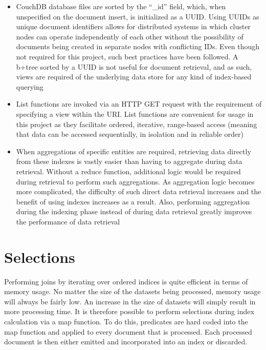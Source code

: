 \begin{itemize}
  \item CouchDB database files are sorted by the ``\_id'' field, which, when unspecified on the document insert, is initialized as a UUID. Using UUIDs as unique document identifiers allows for distributed systems in which cluster nodes can operate independently of each other without the possibility of documents being created in separate nodes with conflicting IDs. Even though not required for this project, such best practices have been followed. A b+tree sorted by a UUID is not useful for document retrieval, and as such, views are required of the underlying data store for any kind of index-based querying
  \item List functions are invoked via an HTTP GET request with the requirement of specifying a view within the URI. List functions are convenient for usage in this project as they facilitate ordered, iterative, range-based access (meaning that data can be accessed sequentially, in isolation and in reliable order)
  \item When aggregations of specific entities are required, retrieving data directly from these indexes is vastly easier than having to aggregate during data retrieval. Without a reduce function, additional logic would be required during retrieval to perform such aggregations. As aggregation logic becomes more complicated, the difficulty of such direct data retrieval increases and the benefit of using indexes increases as a result. Also, performing aggregation during the indexing phase instead of during data retrieval greatly improves the performance of data retrieval
\end{itemize}

\section{Selections}
Performing joins by iterating over ordered indices is quite efficient in terms of memory usage. No matter the size of the datasets being processed, memory usage will always be fairly low. An increase in the size of datasets will simply result in more processing time. It is therefore possible to perform selections during index calculation via a map function. To do this, predicates are hard coded into the map function and applied to every document that is processed. Each processed document is then either emitted and incorporated into an index or discarded.

